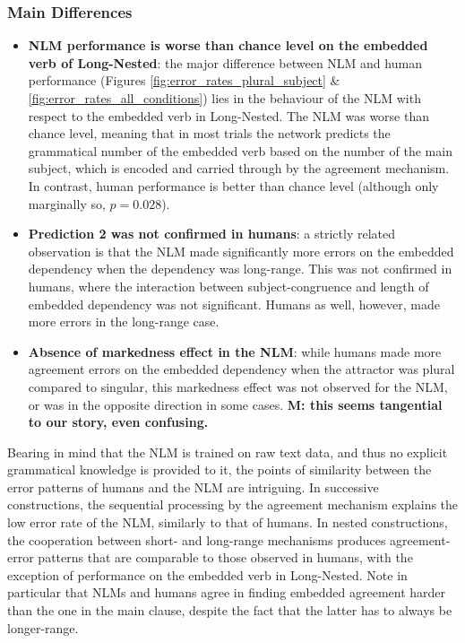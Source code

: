 \subsubsection{Main Differences}
    \begin{itemize}
        \item \textbf{NLM performance is worse than chance level on the embedded verb of Long-Nested}: the major difference between NLM and human performance (Figures \ref{fig:error_rates_plural_subject} \& \ref{fig:error_rates_all_conditions}) lies in the behaviour of the NLM with respect to the embedded verb in Long-Nested. The NLM was worse than chance level, meaning that in most trials the network predicts the grammatical number of the embedded verb based on the number of the main subject, which is encoded and carried through by the agreement mechanism. In contrast, human performance is better than chance level (although only marginally so, $p = 0.028$).
        \item \textbf{Prediction 2 was not confirmed in humans}: a strictly related observation is that the NLM made significantly more errors on the embedded dependency when the dependency was long-range. This was not confirmed in humans, where the interaction between subject-congruence and length of embedded dependency was not significant. Humans as well, however, made more errors in the long-range case.
        \item \textbf{Absence of markedness effect in the NLM}: while humans made more agreement errors on the embedded dependency when the attractor was plural compared to singular, this markedness effect was not observed for the NLM, or was in the opposite direction in some cases. \textbf{M: this seems tangential to our story, even confusing.}
    \end{itemize}
    

Bearing in mind that the NLM is trained on raw text data, and thus no explicit grammatical knowledge is provided to it, the points of similarity between the error patterns of humans and the NLM are intriguing. In successive constructions, the sequential processing by the agreement mechanism explains the low error rate of the NLM, similarly to that of humans. In nested constructions, the cooperation between short- and long-range mechanisms produces agreement-error patterns that are comparable to those observed in humans, with the exception of performance on the embedded verb in Long-Nested.  Note in particular that NLMs and humans agree in finding embedded agreement harder than the one in the main clause, despite the fact that the latter has to always be longer-range.

